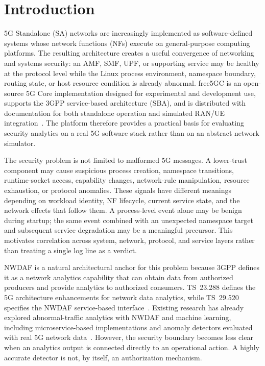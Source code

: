 \documentclass[sigconf,review]{acmart}
\begin{document}


\maketitle

\section{Introduction}
5G Standalone (SA) networks are increasingly implemented as software-defined systems whose network functions (NFs) execute on general-purpose computing platforms. The resulting architecture creates a useful convergence of networking and systems security: an AMF, SMF, UPF, or supporting service may be healthy at the protocol level while the Linux process environment, namespace boundary, routing state, or host resource condition is already abnormal. free5GC is an open-source 5G Core implementation designed for experimental and development use, supports the 3GPP service-based architecture (SBA), and is distributed with documentation for both standalone operation and simulated RAN/UE integration~\cite{free5gc,free5gcdocs}. The platform therefore provides a practical basis for evaluating security analytics on a real 5G software stack rather than on an abstract network simulator.

The security problem is not limited to malformed 5G messages. A lower-trust component may cause suspicious process creation, namespace transitions, runtime-socket access, capability changes, network-rule manipulation, resource exhaustion, or protocol anomalies. These signals have different meanings depending on workload identity, NF lifecycle, current service state, and the network effects that follow them. A process-level event alone may be benign during startup; the same event combined with an unexpected namespace target and subsequent service degradation may be a meaningful precursor. This motivates correlation across system, network, protocol, and service layers rather than treating a single log line as a verdict.

NWDAF is a natural architectural anchor for this problem because 3GPP defines it as a network analytics capability that can obtain data from authorized producers and provide analytics to authorized consumers. TS~23.288 defines the 5G architecture enhancements for network data analytics, while TS~29.520 specifies the NWDAF service-based interface~\cite{ts23288,ts29520}. Existing research has already explored abnormal-traffic analytics with NWDAF and machine learning, including microservice-based implementations and anomaly detectors evaluated with real 5G network data~\cite{yuan2022,mlnwdaf,oliveira2024}. However, the security boundary becomes less clear when an analytics output is connected directly to an operational action. A highly accurate detector is not, by itself, an authorization mechanism.
\end{document}
